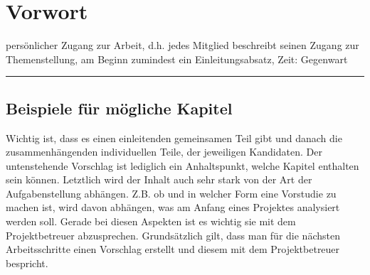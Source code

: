 \chapter*{Vorwort}

persönlicher Zugang zur Arbeit, d.h. jedes Mitglied beschreibt seinen Zugang zur Themenstellung, am Beginn zumindest ein Einleitungsabsatz, Zeit: Gegenwart

\rule{\linewidth}{0.5pt}

\section*{Beispiele für mögliche Kapitel}
Wichtig ist, dass es einen einleitenden gemeinsamen Teil gibt und danach die zusammenhängenden individuellen Teile, der jeweiligen Kandidaten.
Der untenstehende Vorschlag ist lediglich ein Anhaltspunkt, welche Kapitel enthalten sein können. Letztlich wird der Inhalt auch sehr stark von der Art der Aufgabenstellung abhängen. Z.B. ob und in welcher Form eine Vorstudie zu machen ist, wird davon abhängen, was am Anfang eines Projektes analysiert werden soll. Gerade bei diesen Aspekten ist es wichtig sie mit dem Projektbetreuer abzusprechen. 
Grundsätzlich gilt, dass man für die nächsten Arbeitsschritte einen Vorschlag erstellt und diesem mit dem Projektbetreuer bespricht.
